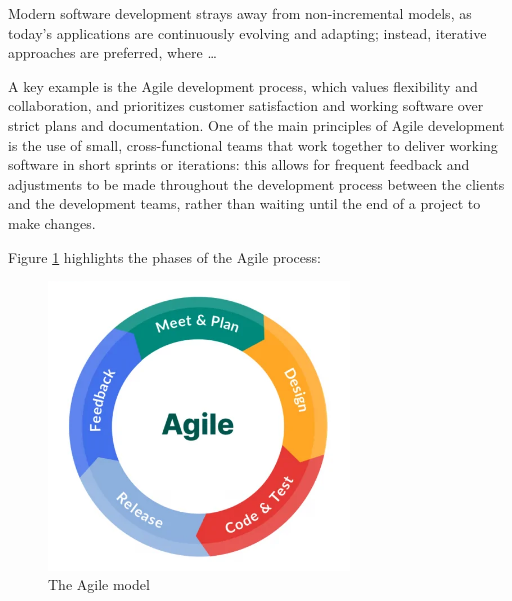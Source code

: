 Modern software development strays away from non-incremental models, as today's applications are continuously evolving and adapting; instead, iterative approaches are preferred, where \dots

A key example is the Agile development process, which values flexibility and collaboration, and prioritizes customer satisfaction and working software over strict plans and documentation. One of the main principles of Agile development is the use of small, cross-functional teams that work together to deliver working software in short sprints or iterations: this allows for frequent feedback and adjustments to be made throughout the development process between the clients and the development teams, rather than waiting until the end of a project to make changes.

Figure \ref{agile_model} highlights the phases of the Agile process:

\begin{figure}[h]
    \centering
    \includegraphics[width=8cm, scale=0.2]{figures/agile_model.jpg}
    \caption{The Agile model}
    \label{agile_model}
\end{figure}

